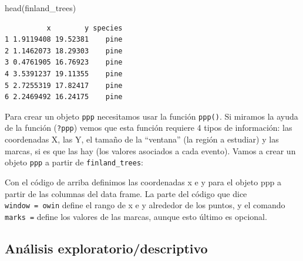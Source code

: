 \documentclass[
  letterpaper,
  DIV=11,
  numbers=noendperiod]{scrreprt}
\newenvironment{Shaded}{\begin{snugshade}}{\end{snugshade}}
\newcommand{\AttributeTok}[1]{\textcolor[rgb]{0.40,0.45,0.13}{#1}}
\newcommand{\DecValTok}[1]{\textcolor[rgb]{0.68,0.00,0.00}{#1}}
\newcommand{\FunctionTok}[1]{\textcolor[rgb]{0.28,0.35,0.67}{#1}}
\newcommand{\NormalTok}[1]{\textcolor[rgb]{0.00,0.23,0.31}{#1}}
\newcommand{\OtherTok}[1]{\textcolor[rgb]{0.00,0.23,0.31}{#1}}
\newcommand{\SpecialCharTok}[1]{\textcolor[rgb]{0.37,0.37,0.37}{#1}}
\newcommand{\StringTok}[1]{\textcolor[rgb]{0.13,0.47,0.30}{#1}}
\begin{document}
\begin{Shaded}
\begin{Highlighting}[]
\FunctionTok{head}\NormalTok{(finland\_trees)}
\end{Highlighting}
\end{Shaded}

\begin{verbatim}
          x        y species
1 1.9119408 19.52381    pine
2 1.1462073 18.29303    pine
3 0.4761905 16.76923    pine
4 3.5391237 19.11355    pine
5 2.7255319 17.82417    pine
6 2.2469492 16.24175    pine
\end{verbatim}

Para crear un objeto \texttt{ppp} necesitamos usar la función
\texttt{ppp()}. Si miramos la ayuda de la función (\texttt{?ppp}) vemos
que esta función requiere 4 tipos de información: las coordenadas X, las
Y, el tamaño de la ``ventana'' (la región a estudiar) y las marcas, si
es que las hay (los valores asociados a cada evento). Vamos a crear un
objeto \texttt{ppp} a partir de \texttt{finland\_trees}:

\begin{Shaded}
\end{Shaded}

Con el código de arriba definimos las coordenadas x e y para el objeto
ppp a partir de las columnas del data frame. La parte del código que
dice \texttt{window\ =\ owin} define el rango de x e y alrededor de los
puntos, y el comando \texttt{marks\ =} define los valores de las marcas,
aunque esto último es opcional.

\hypertarget{anuxe1lisis-exploratoriodescriptivo}{%
\subsection{Análisis
exploratorio/descriptivo}\label{anuxe1lisis-exploratoriodescriptivo}}
\end{document}
